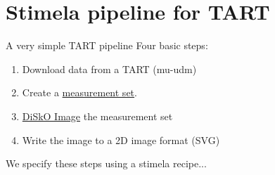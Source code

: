 \documentclass[ignorenonframetext]{beamer}
\begin{document}


\section{Stimela pipeline for TART}


\begin{frame}{A very simple TART pipeline}
Four basic steps:
 \begin{enumerate}
  \item Download data from a TART (mu-udm)
  \item Create a \href{https://casa.nrao.edu/Memos/229.html}{measurement set}.
  \item \href{https://github.com/tmolteno/disko}{DiSkO Image} the measurement set
  \item Write the image to a 2D image format (SVG)
 \end{enumerate}
We specify these steps using a stimela recipe...
\end{frame}
\end{document}
